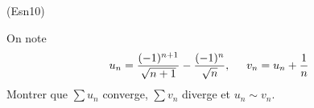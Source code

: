 \begin{tiny}(Esn10)\end{tiny} On note
\begin{displaymath}
  u_n = \frac{(-1)^{n+1}}{\sqrt{n+1}} - \frac{(-1)^{n}}{\sqrt{n}}, \hspace{0.5cm}
  v_n = u_n + \frac{1}{n}
\end{displaymath}
Montrer que $\sum u_n$ converge, $\sum v_n$ diverge et $u_n \sim v_n$.